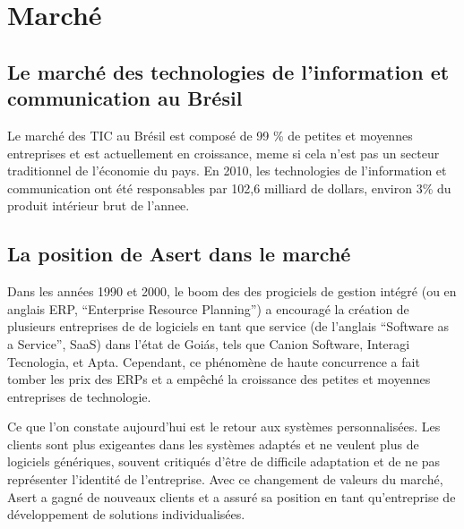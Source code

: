 \section{Marché}
\subsection{Le marché des technologies de l'information et communication au Brésil}

Le marché des TIC au Brésil est composé de 99 \% de petites et moyennes entreprises et est actuellement en croissance, meme si cela n'est pas un secteur traditionnel de l'économie du pays. En 2010, les technologies de l'information et communication ont été responsables par 102,6 milliard de dollars, environ 3\% \cite{pib-brasil} du produit intérieur brut \cite{uol-mercado-tic} de l'annee. 





\subsection{La position de Asert dans le marché}

Dans les années 1990 et 2000, le boom des des progiciels de gestion intégré (ou en anglais ERP,  ``Enterprise Resource Planning'') a encouragé la création de plusieurs entreprises de de logiciels en tant que service (de l'anglais ``Software as a Service'', SaaS) dans l'état de Goiás, tels que Canion Software, Interagi Tecnologia, et Apta. Cependant, ce phénomène de haute concurrence a fait tomber les prix des ERPs et a empêché la croissance des petites et moyennes entreprises de technologie.

Ce que l'on constate aujourd'hui est le retour aux systèmes personnalisées. Les clients sont plus exigeantes dans les systèmes adaptés et ne veulent plus de logiciels génériques, souvent critiqués d'être de difficile adaptation et de ne pas représenter l'identité de l'entreprise. Avec ce changement de valeurs du marché, Asert a gagné de nouveaux clients et a assuré sa position en tant qu'entreprise de développement de solutions individualisées.


